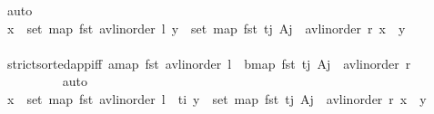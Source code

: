 \begin{isabellebody}
\ auto\isanewline
\ \ \ \ \ \ \isamarkupfalse%
\ \isamarkupfalse%
\ {\isachardoublequoteopen}{\isasymforall}x\ {\isasymin}\ set\ {\isacharparenleft}{\kern0pt}map\ fst\ {\isacharparenleft}{\kern0pt}avl{\isacharunderscore}{\kern0pt}inorder\ l{\isacharparenright}{\kern0pt}{\isacharparenright}{\kern0pt}{\isachardot}{\kern0pt}\ {\isasymforall}y\ {\isasymin}\ set\ {\isacharparenleft}{\kern0pt}map\ fst\ {\isacharparenleft}{\kern0pt}{\isacharparenleft}{\kern0pt}t\isactrlsub j{\isacharcomma}{\kern0pt}\ A\isactrlsub j{\isacharparenright}{\kern0pt}\ {\isacharhash}{\kern0pt}\ avl{\isacharunderscore}{\kern0pt}inorder\ r{\isacharparenright}{\kern0pt}{\isacharparenright}{\kern0pt}{\isachardot}{\kern0pt}\ x\ {\isacharless}{\kern0pt}\ y{\isachardoublequoteclose}\isanewline
\ \ \ \ \ \ \ \ \isamarkupfalse%
\ strict{\isacharunderscore}{\kern0pt}sorted{\isacharunderscore}{\kern0pt}app{\isacharunderscore}{\kern0pt}iff{\isacharbrackleft}{\kern0pt}\ a{\isacharequal}{\kern0pt}{\isachardoublequoteopen}map\ fst\ {\isacharparenleft}{\kern0pt}avl{\isacharunderscore}{\kern0pt}inorder\ l{\isacharparenright}{\kern0pt}{\isachardoublequoteclose}\ \ b{\isacharequal}{\kern0pt}{\isachardoublequoteopen}map\ fst\ {\isacharparenleft}{\kern0pt}{\isacharparenleft}{\kern0pt}t\isactrlsub j{\isacharcomma}{\kern0pt}\ A\isactrlsub j{\isacharparenright}{\kern0pt}\ {\isacharhash}{\kern0pt}\ avl{\isacharunderscore}{\kern0pt}inorder\ r{\isacharparenright}{\kern0pt}{\isachardoublequoteclose}{\isacharbrackright}{\kern0pt}\ \isanewline
\ \ \ \ \ \ \ \ \isamarkupfalse%
\ auto\isanewline
\ \ \ \ \ \ \isamarkupfalse%
\ \isamarkupfalse%
\ {\isachardoublequoteopen}{\isasymforall}x\ {\isasymin}\ set\ {\isacharparenleft}{\kern0pt}map\ fst\ {\isacharparenleft}{\kern0pt}avl{\isacharunderscore}{\kern0pt}inorder\ l{\isacharparenright}{\kern0pt}{\isacharparenright}{\kern0pt}\ {\isasymunion}\ {\isacharbraceleft}{\kern0pt}t\isactrlsub i{\isacharbraceright}{\kern0pt}{\isachardot}{\kern0pt}\ {\isasymforall}y\ {\isasymin}\ set\ {\isacharparenleft}{\kern0pt}map\ fst\ {\isacharparenleft}{\kern0pt}{\isacharparenleft}{\kern0pt}t\isactrlsub j{\isacharcomma}{\kern0pt}\ A\isactrlsub j{\isacharparenright}{\kern0pt}\ {\isacharhash}{\kern0pt}\ avl{\isacharunderscore}{\kern0pt}inorder\ r{\isacharparenright}{\kern0pt}{\isacharparenright}{\kern0pt}{\isachardot}{\kern0pt}\ x\ {\isacharless}{\kern0pt}\ y{\isachardoublequoteclose}\isanewline
\ \ \ \ \ \ \ \ \isamarkupfalse%

\end{isabellebody}
